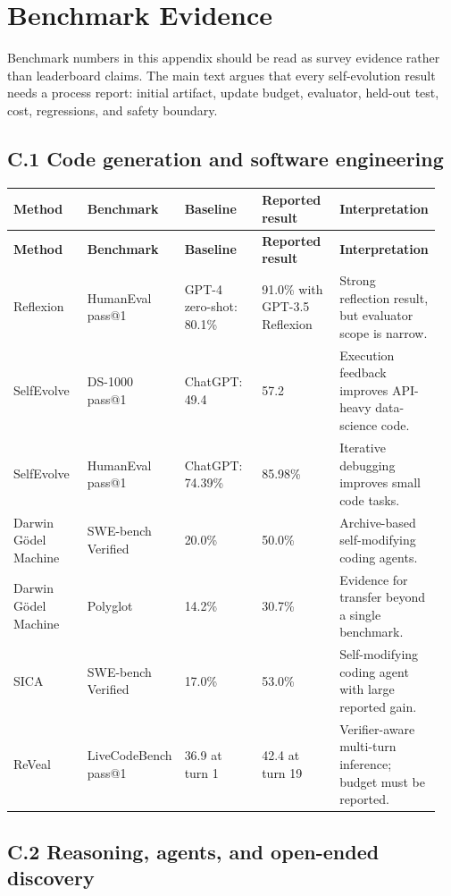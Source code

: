 \section{Benchmark Evidence}
\label{app:benchmarks}

Benchmark numbers in this appendix should be read as survey evidence rather than leaderboard claims. The main text argues that every self-evolution result needs a process report: initial artifact, update budget, evaluator, held-out test, cost, regressions, and safety boundary.

\subsection*{C.1 Code generation and software engineering}

{\TableTight
\begin{longtable}{@{}L{0.18\linewidth}L{0.17\linewidth}L{0.19\linewidth}L{0.19\linewidth}L{0.22\linewidth}@{}}
\toprule
\textbf{Method} & \textbf{Benchmark} & \textbf{Baseline} & \textbf{Reported result} & \textbf{Interpretation} \\
\midrule
\endfirsthead
\toprule
\textbf{Method} & \textbf{Benchmark} & \textbf{Baseline} & \textbf{Reported result} & \textbf{Interpretation} \\
\midrule
\endhead
\bottomrule
\endlastfoot
Reflexion & HumanEval pass@1 & GPT-4 zero-shot: 80.1\% & 91.0\% with GPT-3.5 Reflexion & Strong reflection result, but evaluator scope is narrow. \\
SelfEvolve & DS-1000 pass@1 & ChatGPT: 49.4 & 57.2 & Execution feedback improves API-heavy data-science code. \\
SelfEvolve & HumanEval pass@1 & ChatGPT: 74.39\% & 85.98\% & Iterative debugging improves small code tasks. \\
Darwin G\"{o}del Machine & SWE-bench Verified & 20.0\% & 50.0\% & Archive-based self-modifying coding agents. \\
Darwin G\"{o}del Machine & Polyglot & 14.2\% & 30.7\% & Evidence for transfer beyond a single benchmark. \\
SICA & SWE-bench Verified & 17.0\% & 53.0\% & Self-modifying coding agent with large reported gain. \\
ReVeal & LiveCodeBench pass@1 & 36.9 at turn 1 & 42.4 at turn 19 & Verifier-aware multi-turn inference; budget must be reported. \\
\end{longtable}}

\subsection*{C.2 Reasoning, agents, and open-ended discovery}

